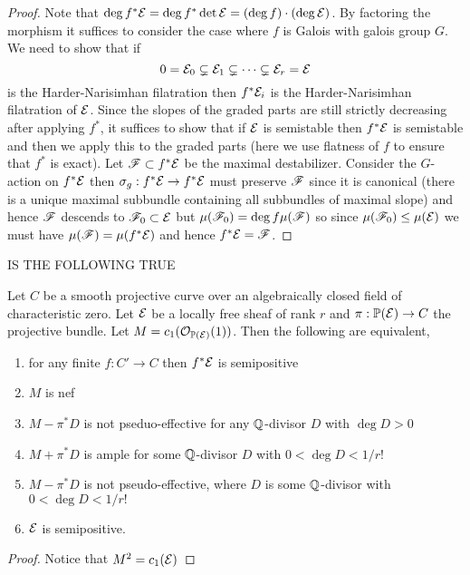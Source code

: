 \documentclass[12pt]{article}
\begin{document}
\begin{proof}
Note that $\deg{f^* \mathcal{E}} = \deg{f^* \det{\mathcal{E}}} = (\deg{f}) \cdot (\deg{\mathcal{E}})$. By factoring the morphism it suffices to consider the case where $f$ is Galois with galois group $G$. We need to show that if
\[ 0 = \mathcal{E}_0 \subsetneq \mathcal{E}_1 \subsetneq \cdots \subsetneq \mathcal{E}_r = \mathcal{E} \]
is the Harder-Narisimhan filatration then $f^* \mathcal{E}_i$ is the Harder-Narisimhan filatration of $\mathcal{E}$. Since the slopes of the graded parts are still strictly decreasing after applying $f^*$, it suffices to show that if $\mathcal{E}$ is semistable then $f^* \mathcal{E}$ is semistable and then we apply this to the graded parts (here we use flatness of $f$ to ensure that $f^*$ is exact). Let $\mathscr{F} \subset f^* \mathcal{E}$ be the maximal destabilizer. Consider the $G$-action on $f^* \mathcal{E}$ then $\sigma_g : f^* \mathcal{E} \to f^* \mathcal{E}$ must preserve $\mathscr{F}$ since it is canonical (there is a unique maximal subbundle containing all subbundles of maximal slope) and hence $\mathscr{F}$ descends to $\mathscr{F}_0 \subset \mathcal{E}$ but $\mu(\mathscr{F}_0) = \deg{f} \mu(\mathscr{F})$ so since $\mu(\mathscr{F}_0) \le \mu(\mathcal{E})$ we must have $\mu(\mathscr{F}) = \mu(f^* \mathcal{E})$ and hence $f^* \mathcal{E} = \mathscr{F}$. 
\end{proof}

{\color{red} IS THE FOLLOWING TRUE}

\begin{prop}
Let $C$ be a smooth projective curve over an algebraically closed field of characteristic zero. Let $\mathcal{E}$ be a locally free sheaf of rank $r$ and $\pi : \mathbb{P}(\mathcal{E}) \to C$ the projective bundle. Let $M = c_1(\mathcal{O}_{\mathbb{P}(\mathcal{E})}(1))$. Then the following are equivalent,
\begin{enumerate}
\item for any finite $f : C' \to C$ then $f^* \mathcal{E}$ is semipositive
\item $M$ is nef
\item $M - \pi^* D$ is not pseduo-effective for any $\mathbb{Q}$-divisor $D$ with $\deg{D} > 0$
\item $M + \pi^* D$ is ample for some $\mathbb{Q}$-divisor $D$ with $0 < \deg{D} < 1/r!$
\item $M - \pi^* D$ is not pseudo-effective, where $D$ is some $\mathbb{Q}$-divisor with $0 < \deg{D} < 1/r!$
\item $\mathcal{E}$ is semipositive.
\end{enumerate}
\end{prop}

\begin{proof}
Notice that $M^2 = c_1(\mathcal{E})$
\end{proof}
\end{document}
